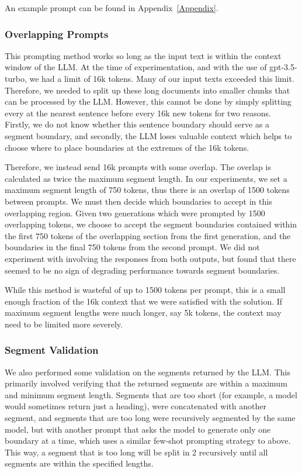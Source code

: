 An example prompt can be found in Appendix~\ref{Appendix}.

\subsubsection{Overlapping Prompts}

This prompting method works so long as the input text is within the context window of the LLM. At the time of experimentation, and with the use of gpt-3.5-turbo, we had a limit of 16k tokens. Many of our input texts exceeded this limit. Therefore, we needed to split up these long documents into smaller chunks that can be processed by the LLM. However, this cannot be done by simply splitting every at the nearest sentence before every 16k new tokens for two reasons. Firstly, we do not know whether this sentence boundary should serve as a segment boundary, and secondly, the LLM loses valuable context which helps to choose where to place boundaries at the extremes of the 16k tokens.

Therefore, we instead send 16k prompts with some overlap. The overlap is calculated as twice the maximum segment length. In our experiments, we set a maximum segment length of 750 tokens, thus there is an overlap of 1500 tokens between prompts. We must then decide which boundaries to accept in this overlapping region. Given two generations which were prompted by 1500 overlapping tokens, we choose to accept the segment boundaries contained within the first 750 tokens of the overlapping section from the first generation, and the boundaries in the final 750 tokens from the second prompt. We did not experiment with involving the responses from both outputs, but found that there seemed to be no sign of degrading performance towards segment boundaries.

While this method is wasteful of up to 1500 tokens per prompt, this is a small enough fraction of the 16k context that we were satisfied with the solution. If maximum segment lengths were much longer, say 5k tokens, the context may need to be limited more severely.

\subsubsection{Segment Validation}

We also performed some validation on the segments returned by the LLM. This primarily involved verifying that the returned segments are within a maximum and minimum segment length. Segments that are too short (for example, a model would sometimes return just a heading), were concatenated with another segment, and segments that are too long were recursively segmented by the same model, but with another prompt that asks the model to generate only one boundary at a time, which uses a similar few-shot prompting strategy to above. This way, a segment that is too long will be split in 2 recursively until all segments are within the specified lengths.